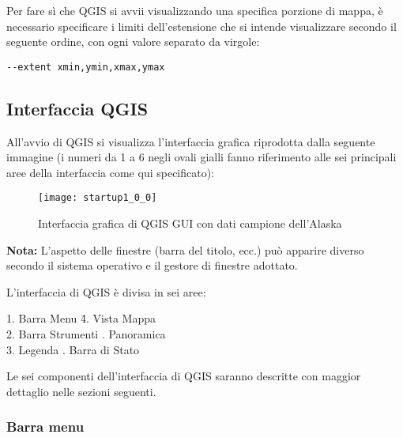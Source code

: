 Per fare sì che QGIS si avvii visualizzando una specifica porzione di mappa, è necessario
specificare i limiti dell'estensione che si intende visualizzare secondo il seguente ordine,
con ogni valore separato da virgole:

\begin{verbatim}
--extent xmin,ymin,xmax,ymax
\end{verbatim}


\subsection{Interfaccia QGIS}
\label{label_qgismainwindow}

All'avvio di QGIS si visualizza l'interfaccia grafica riprodotta dalla seguente immagine  
(i numeri da 1 a 6 negli ovali gialli fanno riferimento alle sei principali aree della
interfaccia come qui specificato):

\begin{figure}[ht]
   \begin{center}
   \caption{Interfaccia grafica di QGIS GUI con dati campione dell'Alaska \wincaption}
	 \label{fig:startup}
   \texttt{[image: startup1\_0\_0]}
\end{center} 
\end{figure}

\textbf{Nota:} L'aspetto delle finestre (barra del titolo, ecc.) può apparire diverso
secondo il sistema operativo e il gestore di finestre adottato.

L'interfaccia di QGIS è divisa in sei aree:

\begin{tabbing}
1. Barra Menu \hspace{3cm}\= 4. Vista Mappa \\
2. Barra Strumenti \hspace{3cm}. Panoramica  \\
3. Legenda \hspace{3cm}. Barra di Stato   
\end{tabbing}

Le sei componenti dell'interfaccia di QGIS saranno descritte con maggior dettaglio
nelle sezioni seguenti.

\subsubsection{Barra menu}\label{label_menubar}

